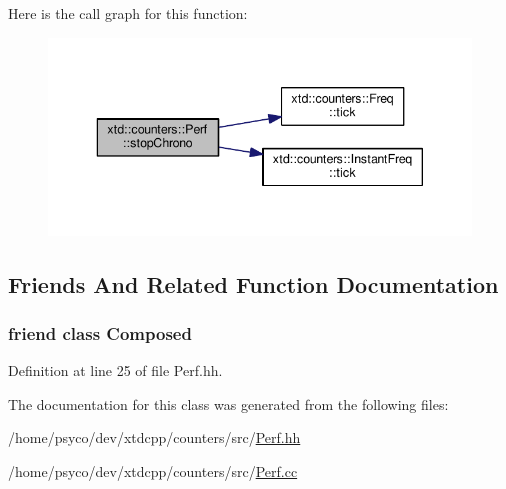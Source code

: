Here is the call graph for this function\+:
\nopagebreak
\begin{figure}[H]
\begin{center}
\leavevmode
\includegraphics[width=343pt]{classxtd_1_1counters_1_1Perf_a905d73c1604d74e28bb56ea2bb4867ef_cgraph}
\end{center}
\end{figure}




\subsection{Friends And Related Function Documentation}
\subsubsection[{\texorpdfstring{Composed}{Composed}}]{\setlength{\rightskip}{0pt plus 5cm}friend class {\bf Composed}\hspace{0.3cm}{\ttfamily [friend]}}\hypertarget{classxtd_1_1counters_1_1Perf_a93e934ad70d5b32b14beed5572450abf}{}\label{classxtd_1_1counters_1_1Perf_a93e934ad70d5b32b14beed5572450abf}


Definition at line 25 of file Perf.\+hh.



The documentation for this class was generated from the following files\+:\begin{DoxyCompactItemize}
\item 
/home/psyco/dev/xtdcpp/counters/src/\hyperlink{Perf_8hh}{Perf.\+hh}\item 
/home/psyco/dev/xtdcpp/counters/src/\hyperlink{Perf_8cc}{Perf.\+cc}\end{DoxyCompactItemize}
